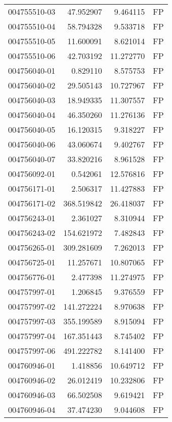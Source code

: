 \begin{tabular}{lrrl}
004755510-03 &   47.952907 &       9.464115 &   FP \\
004755510-04 &   58.794328 &       9.533718 &   FP \\
004755510-05 &   11.600091 &       8.621014 &   FP \\
004755510-06 &   42.703192 &      11.272770 &   FP \\
004756040-01 &    0.829110 &       8.575753 &   FP \\
004756040-02 &   29.505143 &      10.727967 &   FP \\
004756040-03 &   18.949335 &      11.307557 &   FP \\
004756040-04 &   46.350260 &      11.276136 &   FP \\
004756040-05 &   16.120315 &       9.318227 &   FP \\
004756040-06 &   43.060674 &       9.402767 &   FP \\
004756040-07 &   33.820216 &       8.961528 &   FP \\
004756092-01 &    0.542061 &      12.576816 &   FP \\
004756171-01 &    2.506317 &      11.427883 &   FP \\
004756171-02 &  368.519842 &      26.418037 &   FP \\
004756243-01 &    2.361027 &       8.310944 &   FP \\
004756243-02 &  154.621972 &       7.482843 &   FP \\
004756265-01 &  309.281609 &       7.262013 &   FP \\
004756725-01 &   11.257671 &      10.807065 &   FP \\
004756776-01 &    2.477398 &      11.274975 &   FP \\
004757997-01 &    1.206845 &       9.376559 &   FP \\
004757997-02 &  141.272224 &       8.970638 &   FP \\
004757997-03 &  355.199589 &       8.915094 &   FP \\
004757997-04 &  167.351443 &       8.745402 &   FP \\
004757997-06 &  491.222782 &       8.141400 &   FP \\
004760946-01 &    1.418856 &      10.649712 &   FP \\
004760946-02 &   26.012419 &      10.232806 &   FP \\
004760946-03 &   66.502508 &       9.619421 &   FP \\
004760946-04 &   37.474230 &       9.044608 &   FP \\

\end{tabular}
